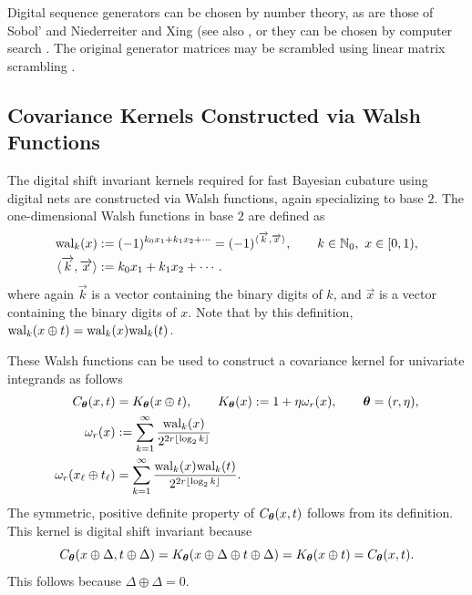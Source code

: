 \documentclass[graybox,footinfo]{svmult}
\begin{document}
Digital sequence generators can be chosen by number theory, as are those of Sobol' \cite{Sob67} and Niederreiter and Xing  \cite{NieXin01a} (see also \cite[Chapter 8]{DicPil10a}, or they can be chosen by computer search \cite[Chapter 10]{DicPil10a}.  The original generator matrices may be scrambled using linear matrix scrambling \cite{Mat98}.


\subsection{Covariance Kernels Constructed via Walsh Functions} \label{FJ:sec:Walsh_kernels}

The digital shift invariant kernels required for fast Bayesian cubature using digital nets are constructed via Walsh functions, again specializing to base $2$. 
The one-dimensional Walsh functions in base $2$ are defined as
\begin{align}
    \label{FJ:eqn:walsh_func}
\textup{wal}_{k}(x) & := (-1)^{k_0 x_1 + k_1 x_2 + \cdots} = (-1)^{\langle \overrightarrow{k}, \overrightarrow{x} \rangle},  \qquad k \in {\N}_0, \ x \in [0,1), \\
\nonumber
\langle \overrightarrow{k}, \overrightarrow{x} \rangle & : = k_{0} x_{1} + k_{1} x_{2} + \cdots .
\end{align}
where again $\overrightarrow{k}$ is a vector containing the binary digits of $k$, and $\overrightarrow{x}$ is a vector containing the binary digits of $x$.  Note that by this definition, $\textup{wal}_{k}(x \oplus t) =  \textup{wal}_{k}(x) \textup{wal}_{k}(t)$.  

These Walsh functions can be used to construct a covariance kernel for univariate integrands as follows
\begin{align*}
    C_{\boldsymbol{\theta}} (x,t) & = K_{\boldsymbol{\theta}}(x \oplus t), \qquad K_{\boldsymbol{\theta}}(x) : = 1 + \eta \omega_{r} (x), \qquad {\boldsymbol{\theta}} = (r,\eta), \\
    \omega_r(x) & := \sum_{k=1}^\infty \frac{\textup{wal}_{k}(x) }{2^{2r \lfloor \log_2 k \rfloor}} \\
    \omega_{r} (x_\ell \oplus t_\ell) & = \sum_{k=1}^\infty \frac{\textup{wal}_{k}(x) \textup{wal}_{k}(t)  }{2^{2r \lfloor \log_2 k \rfloor}}.
\end{align*}
The symmetric, positive definite property of $ C_{\boldsymbol{\theta}} (x,t)$ follows from its definition.  This kernel is digital shift invariant because 
\[
C_{\boldsymbol{\theta}} (x \oplus \Delta ,t \oplus \Delta ) = K_{\boldsymbol{\theta}}(x \oplus \Delta \oplus t \oplus \Delta) = K_{\boldsymbol{\theta}}(x \oplus t) =  C_{\boldsymbol{\theta}} (x,t).
\]
This follows because $\Delta \oplus \Delta = 0$.
\end{document}
